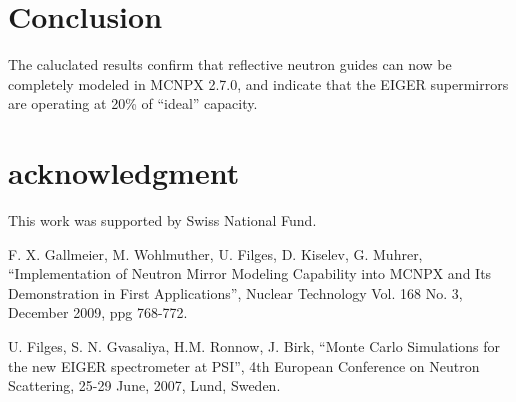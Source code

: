 \documentclass[a4paper,
              ]{jacow}
\begin{document}
\section{Conclusion}

The caluclated results confirm that reflective neutron guides can now be completely modeled in MCNPX 2.7.0, and indicate that the EIGER supermirrors are operating at 20\% of ``ideal'' capacity.  

\section{acknowledgment}

This work was supported by Swiss National Fund.

\begin{thebibliography}{99} %

  F. X. Gallmeier, M. Wohlmuther, U. Filges, D. Kiselev, G. Muhrer,
  ``Implementation of Neutron Mirror Modeling Capability into MCNPX and Its Demonstration in First Applications'',
  Nuclear Technology Vol. 168 No. 3, December 2009, ppg 768-772. 

  U. Filges, S. N. Gvasaliya, H.M. Ronnow, J. Birk,
  ``Monte Carlo Simulations for the new EIGER spectrometer at PSI'',
  4th European Conference on Neutron Scattering, 25-29 June, 2007, Lund, Sweden. \\

\end{thebibliography}
\end{document}
